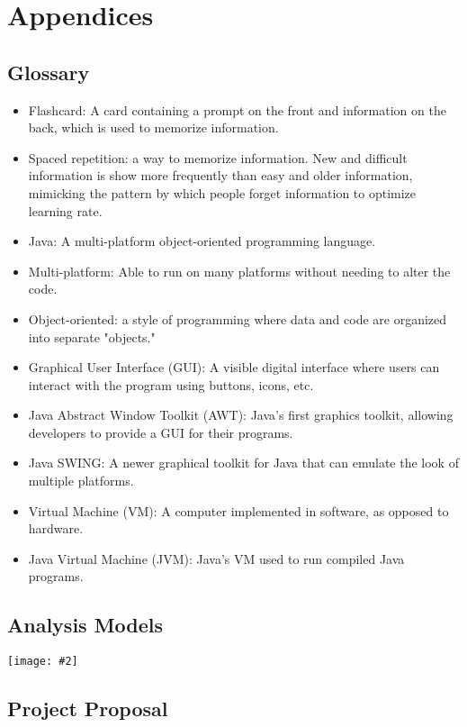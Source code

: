\documentclass{scrreprt}
\newcommand{\image}[2][1]{
    \begin{center}
        \texttt{[image: \#2]}
    \end{center}
}
\begin{document}
\chapter{Appendices}

\section{Glossary}
\begin{itemize}
    \item Flashcard: A card containing a prompt on the front and information on the back,
        which is used to memorize information.
    \item Spaced repetition: a way to memorize information. New and difficult information
        is show more frequently than easy and older information, mimicking the pattern
        by which people forget information to optimize learning rate.
    \item Java: A multi-platform object-oriented programming language.
    \item Multi-platform: Able to run on many platforms without needing to alter the code.
    \item Object-oriented: a style of programming where data and code are organized into
        separate "objects."
    \item Graphical User Interface (GUI): A visible digital interface where users can 
        interact with the program using buttons, icons, etc.
    \item Java Abstract Window Toolkit (AWT): Java's first graphics toolkit, allowing developers
        to provide a GUI for their programs.
    \item Java SWING: A newer graphical toolkit for Java that can emulate the look of multiple platforms.
    \item Virtual Machine (VM): A computer implemented in software, as opposed to hardware.
    \item Java Virtual Machine (JVM): Java's VM used to run compiled Java programs.
\end{itemize}

\section{Analysis Models}
\image[0.4]{arion-use-case-diagram}

\section{Project Proposal}
\end{document}
